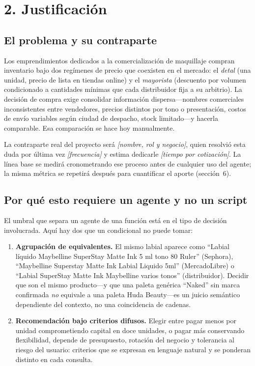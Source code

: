 \documentclass[11pt,letterpaper]{article}
\newcommand{\pendiente}[1]{\textcolor{ustaAzul}{\textit{[#1]}}}
\begin{document}
\section*{2. Justificación}

\subsection*{El problema y su contraparte}

Los emprendimientos dedicados a la comercialización de maquillaje compran inventario bajo dos
regímenes de precio que coexisten en el mercado: el \emph{detal} (una unidad, precio de lista en
tiendas online) y el \emph{mayorista} (descuento por volumen condicionado a cantidades mínimas
que cada distribuidor fija a su arbitrio). La decisión de compra exige consolidar información
dispersa---nombres comerciales inconsistentes entre vendedores, precios distintos por tono o
presentación, costos de envío variables según ciudad de despacho, stock limitado---y hacerla
comparable. Esa comparación se hace hoy manualmente.

La contraparte real del proyecto será \pendiente{nombre, rol y negocio}, quien resolvió esta duda
por última vez \pendiente{frecuencia} y estima dedicarle \pendiente{tiempo por cotización}. La
línea base se medirá cronometrando ese proceso antes de cualquier uso del agente; la misma métrica
se repetirá después para cuantificar el aporte (sección~6).

\subsection*{Por qué esto requiere un agente y no un script}

El umbral que separa un agente de una función está en el tipo de decisión involucrada. Aquí hay
dos que un condicional no puede tomar:

\begin{enumerate}[leftmargin=*,itemsep=2pt]
\item \textbf{Agrupación de equivalentes.} El mismo labial aparece como ``Labial líquido Maybelline
SuperStay Matte Ink 5 ml tono 80 Ruler'' (Sephora), ``Maybelline Superstay Matte Ink Labial Liquido
5ml'' (MercadoLibre) o ``Labial SuperStay Matte Ink Maybelline varios tonos'' (distribuidor).
Decidir que son el mismo producto---y que una paleta genérica ``Naked'' sin marca confirmada
\emph{no} equivale a una paleta Huda Beauty---es un juicio semántico dependiente del contexto, no
una coincidencia de cadenas.
\item \textbf{Recomendación bajo criterios difusos.} Elegir entre pagar menos por unidad comprometiendo
capital en doce unidades, o pagar más conservando flexibilidad, depende de presupuesto, rotación del
negocio y tolerancia al riesgo del usuario: criterios que se expresan en lenguaje natural y se ponderan
distinto en cada consulta.
\end{enumerate}
\end{document}
